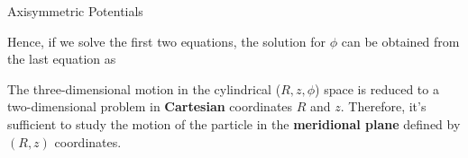\documentclass[letterpaper,landscape]{slides}
\begin{document}
\begin{slide}
\begin{center}
{\large \color{red} 
                       Axisymmetric Potentials   }
\end{center}

Hence, if we solve the first two equations, the solution for $\phi$
can be obtained from the last equation as


The three-dimensional motion in the cylindrical ($R,z,\phi$) space is
reduced to a two-dimensional problem in {\bf Cartesian} coordinates $R$ and
$z$.  Therefore, it's sufficient to study the motion of the particle in the
{\bf meridional plane} defined by $(R, z)$ coordinates.

\end{slide}

\begin{slide}

\begin{center}
\vskip -0.0in
\end{center}


\vfill
\end{slide}
\end{document}
